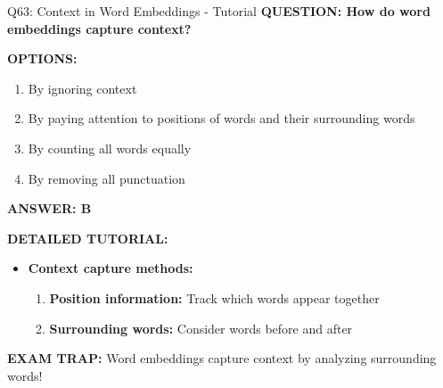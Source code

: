 \documentclass[8pt]{beamer}
\begin{document}
	\begin{frame}{Q63: Context in Word Embeddings - Tutorial}
		\fontsize{6.5}{7.5}\selectfont
		\textbf{QUESTION: How do word embeddings capture context?}
		
		\vspace{0.1cm}
		\textbf{OPTIONS:}
		\begin{enumerate}
			\item By ignoring context
			\item By paying attention to positions of words and their surrounding words
			\item By counting all words equally
			\item By removing all punctuation
		\end{enumerate}
		
		\vspace{0.1cm}
		\textcolor{myblue}{\textbf{ANSWER: B}}
		
		\vspace{0.1cm}
		\textbf{DETAILED TUTORIAL:}
		\begin{itemize}
			\item \textbf{Context capture methods:}
			\begin{enumerate}
				\item \textbf{Position information:} Track which words appear together
				\item \textbf{Surrounding words:} Consider words before and after
			\end{enumerate}
		\end{itemize}
		
		\textcolor{myred}{\textbf{EXAM TRAP:}} Word embeddings capture context by \textcolor{myblue}{analyzing surrounding words}!
	\end{frame}
	
\end{document}
